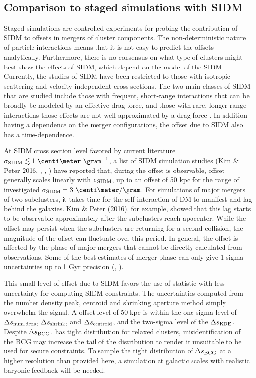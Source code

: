   
\subsection{Comparison to staged simulations with SIDM}
\label{subsec:SIDM_sim}
Staged simulations are controlled experiments for probing the contribution
of SIDM to offsets in mergers of cluster components. 
The non-deterministic nature of particle interactions means that it is not easy
to predict the offsets analytically.
Furthermore, there is no consensus on what type of clusters might best show the
effects of SIDM, which depend on the model of the SIDM.
Currently, the studies of SIDM have been restricted to those with isotropic
scattering and velocity-independent cross sections.   
The two main classes of SIDM that are studied include those with 
frequent, short-range interactions that can be broadly be modeled by an
effective drag force, and those with rare, longer range interactions those
effects are not well approximated by a drag-force \citep{Kahlhoefer14}. 
In addition having a dependence on the merger configurations, the offset due to
SIDM also has a time-dependence.    

At SIDM cross section level favored by current literature $\sigma_{\rm SIDM}
\lesssim 1~\centi\meter ~\gram^{-1}$, a list of SIDM simulation studies (Kim \&
Peter 2016, \citealt{Robertson2016}, \citealt{Kahlhoefer14}, \citealt{Randall2008d})
have reported that, during the offset is observable, 
offset generally scales linearly with $\sigma_{\rm SIDM}$,  
up to an offset of 50 kpc for the range of investigated $\sigma_{\rm SIDM} = 3
~\centi\meter / \gram$.
For simulations of major mergers of two subclusters, it takes time for the self-interaction of DM
to manifest and lag behind the galaxies. Kim \& Peter (2016), for example, showed that
this lag starts to be observable approximately after the subclusters reach apocenter. 
While the offset may persist when the subclusters are returning for a
second collision, the magnitude of the offset can fluctuate over this period.
In general, the offset is affected by the phase of major mergers that cannot be
directly calculated from observations. Some of the best estimates of merger phase 
can only give 1-sigma uncertainties up
to 1 Gyr precision (\citealt{D13}, \citealt{Ng2014}).

This small level of offset due to SIDM favors the use of statistic 
with less uncertainty for computing SIDM constraints. 
The uncertainties computed from the number density peak, centroid and shrinking
aperture method simply overwhelm the signal. 
A offset level of 50 kpc is within the one-sigma level of $\Delta s_{\rm num.
dens}$, $\Delta s_{\rm shrink}$, and $\Delta s_{\rm centroid}$, and the two-sigma
level of the $\Delta s_{\rm KDE}$. 
 Despite $\Delta s_{\rm BCG}$. 
 has tight distribution for relaxed clusters, misidentification of the BCG 
may increase the tail of the distribution to render it unsuitable to be used 
for secure constraints. To sample the tight distribution of $\Delta s_{\rm
BCG}$ at a higher
resolution than provided here, a simulation at galactic scales with realistic
baryonic feedback will be needed. 

